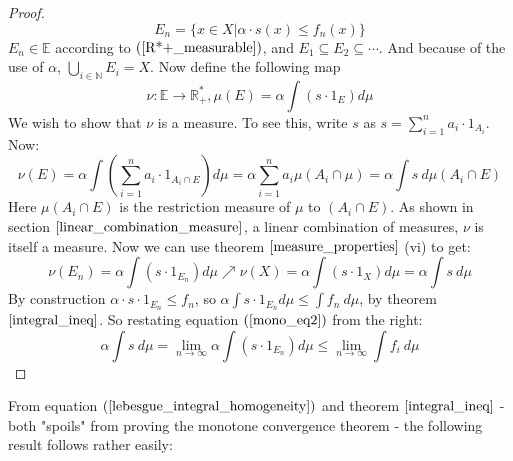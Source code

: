 \documentclass[12pt, a4paper]{article}
\numberwithin{equation}{section}
\begin{document}
\begin{proof}
\begin{equation}
E_n=\{x\in X|\alpha\cdot s(x)\le f_n(x)\}
\end{equation}
$E_n\in\mathbb{E}$ according to $(\ref{R*+_measurable})$, and $E_1\subseteq E_2\subseteq\cdots$. And because of the use of $\alpha$, $\bigcup_{i\in\mathbb{N}}E_i=X$. Now define the following map
\begin{equation}
\nu:\mathbb{E}\rightarrow\mathbb{R}^*_+,\mu(E)=\alpha\int(s\cdot 1_E)d\mu
\end{equation}
We wish to show that $\nu$ is a measure. To see this, write $s$ as $s=\sum_{i=1}^n a_i\cdot 1_{A_i}$. Now:
\begin{equation}
\nu(E)=\alpha\int\left(\sum_{i=1}^n a_i\cdot 1_{A_i\cap E}\right)d\mu=\alpha\sum_{i=1}^n a_i\mu(A_i\cap\mu)=\alpha\int s\ d\mu(A_i\cap E)
\end{equation}
Here $\mu(A_i\cap E)$ is the restriction measure of $\mu$ to $(A_i\cap E)$. As shown in section $\ref{linear_combination_measure}$, a linear combination of measures, $\nu$ is itself a measure. Now we can use theorem $\ref{measure_properties}$ (vi) to get:
\begin{equation}
\label{mono_eq2}
\nu(E_n)=\alpha\int(s\cdot 1_{E_n})d\mu\nearrow\nu(X)=\alpha\int(s\cdot 1_X)d\mu=\alpha\int s\ d\mu
\end{equation}
By construction $\alpha\cdot s\cdot 1_{E_n}\le f_n$, so $\alpha\int s\cdot 1_{E_n}d\mu\le\int f_n\ d\mu$, by theorem $\ref{integral_ineq}$. So restating equation $(\ref{mono_eq2})$ from the right:
\begin{equation}
\alpha\int s\ d\mu=\lim_{n\rightarrow\infty}\alpha\int(s\cdot 1_{E_n})d\mu\le\lim_{n\rightarrow\infty}\int f_i\ d\mu
\end{equation}
\end{proof}

From equation $(\ref{lebesgue_integral_homogeneity})$ and theorem $\ref{integral_ineq}$ - both "spoils" from proving the monotone convergence theorem - the following result follows rather easily:
\end{document}
